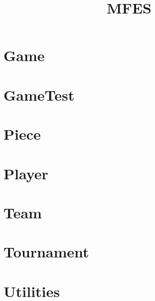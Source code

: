 \documentclass{article}
\begin{document}
\title{MFES}
\author{}
\maketitle
\tableofcontents

\section{Game}

\section{GameTest}

\section{Piece}

\section{Player}

\section{Team}

\section{Tournament}

\section{Utilities}

\end{document}
